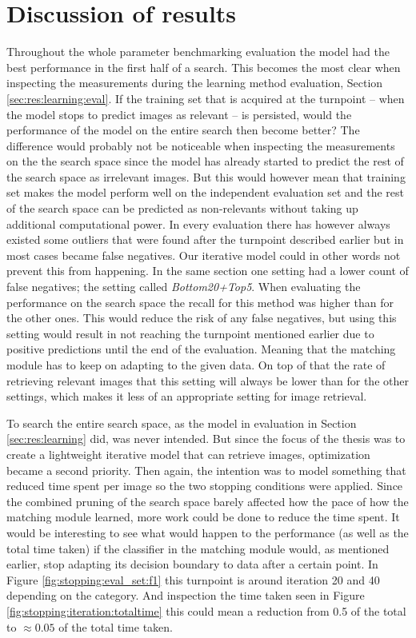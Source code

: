 
\section{Discussion of results}
\label{sec:concl:meas}
Throughout the whole parameter benchmarking evaluation the model had the best performance in the first half of a search. This becomes the most clear when inspecting the measurements during the learning method evaluation, Section \ref{sec:res:learning:eval}. If the training set that is acquired at the turnpoint -- when the model stops to predict images as relevant -- is persisted, would the performance of the model on the entire search then become better? The difference would probably not be noticeable when inspecting the measurements on the the search space since the model has already started to predict the rest of the search space as irrelevant images. But this would however mean that training set makes the model perform well on the independent evaluation set and the rest of the search space can be predicted as non-relevants without taking up additional computational power. In every evaluation there has however always existed some outliers that were found after the turnpoint described earlier but in most cases became false negatives. Our iterative model could in other words not prevent this from happening. 
In the same section one setting had a lower count of false negatives; the setting called \emph{Bottom20+Top5}. When evaluating the performance on the search space the recall for this method was higher than for the other ones. This would reduce the risk of any false negatives, but using this setting would result in not reaching the turnpoint mentioned earlier due to positive predictions until the end of the evaluation. Meaning that the matching module has to keep on adapting to the given data. On top of that the rate of retrieving relevant images that this setting will always be lower than for the other settings, which makes it less of an appropriate setting for image retrieval. 


To search the entire search space, as the model in evaluation in Section \ref{sec:res:learning} did, was never intended. But since the focus of the thesis was to create a lightweight iterative model that can retrieve images, optimization became a second priority. Then again, the intention was to model something that reduced time spent per image so the two stopping conditions were applied. Since the combined pruning of the search space barely affected how the pace of how the matching module learned, more work could be done to reduce the time spent. It would be interesting to see what would happen to the performance (as well as the total time taken) if the classifier in the matching module would, as mentioned earlier, stop adapting its decision boundary to data after a certain point. In Figure \ref{fig:stopping:eval_set:f1} this turnpoint is around iteration 20 and 40 depending on the category. And inspection the time taken seen in Figure \ref{fig:stopping:iteration:totaltime} this could mean a reduction from 0.5 of the total to $\approx0.05$ of the total time taken.  


